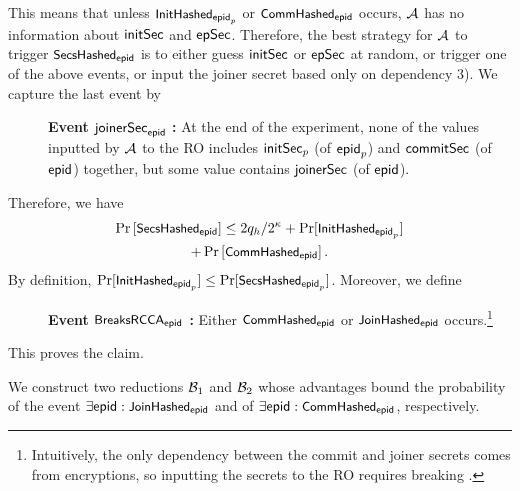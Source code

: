 This means that unless $\initHash_{\hgnodeid_p}$ or $\commitHash_{\hgnodeid}$ occurs, $\Adv$ has no information about $\initSecret$ and $\epochSecret$. Therefore, the best strategy for $\Adv$ to trigger $\secsHash_\hgnodeid$ is to either guess $\initSecret$ or $\epochSecret$ at random, or trigger one of the above events, or input the joiner secret based only on dependency 3). We capture the last event by
\begin{description}
  \item[] {\bf Event $\joinerSecret_{\hgnodeid}$ : } At the end of the experiment, none of the values inputted by $\Adv$ to the RO includes $\initSecret_p$ (of $\hgnodeid_p$) and $\commitSecret$ (of $\hgnodeid$) together, but some value contains $\joinerSecret$ (of $\hgnodeid$).
\end{description}

Therefore, we have
\begin{multline*}
  \Pr\left[\secsHash_\hgnodeid\right] \leq 2q_h/2^\kappa + \Pr[\initHash_{\hgnodeid_p}] \\ + \Pr\left[\commitHash_{\hgnodeid}\right].
\end{multline*}
By definition, $\Pr[\initHash_{\hgnodeid_p}] \leq \Pr[\secsHash_{\hgnodeid_p}]$. Moreover, we define
\begin{description}
  \item[] {\bf Event $\breaksRcca_\hgnodeid$ : } Either $\commitHash_{\hgnodeid}$ or $\joinerHash_{\hgnodeid}$ occurs.\footnote{Intuitively,
    the only dependency between the commit and joiner secrets comes from encryptions, so inputting the secrets to the RO requires breaking \indrcca.}
\end{description}
This proves the claim.

We construct two reductions $\Bdv[1]$ and $\Bdv[2]$ whose advantages bound the probability of the event $\exists \hgnodeid : \joinerHash_{\hgnodeid}$ and of $\exists \hgnodeid : \commitHash_{\hgnodeid}$, respectively.

